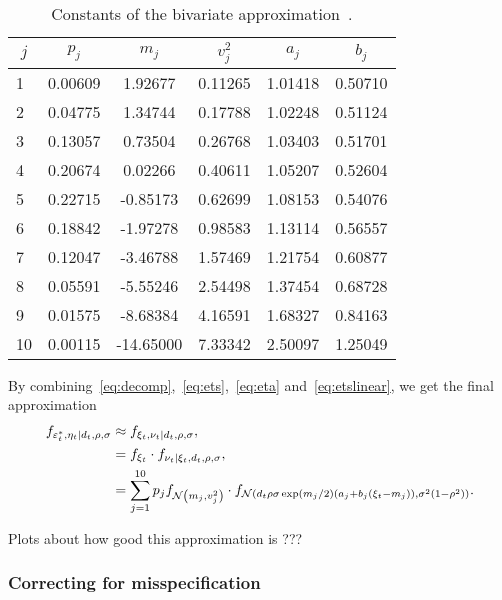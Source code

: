 \begin{table}[h!]
	\centering
	\caption{Constants of the bivariate approximation~\citep{Omori2007}.}
	\label{tab:constants}
	\begin{tabular}{cccccc}
		$j$                       & $p_j$    & $m_j$      & $v_j^2$ & $a_j$    & $b_j$    \\ \hline
		\multicolumn{1}{l|}{1}  & 0.00609 & 1.92677   & 0.11265                & 1.01418 & 0.50710 \\
		\multicolumn{1}{l|}{2}  & 0.04775 & 1.34744   & 0.17788                & 1.02248 & 0.51124 \\
		\multicolumn{1}{l|}{3}  & 0.13057 & 0.73504   & 0.26768                & 1.03403 & 0.51701 \\
		\multicolumn{1}{l|}{4}  & 0.20674 & 0.02266   & 0.40611                & 1.05207 & 0.52604 \\
		\multicolumn{1}{l|}{5}  & 0.22715 & -0.85173  & 0.62699                & 1.08153 & 0.54076 \\
		\multicolumn{1}{l|}{6}  & 0.18842 & -1.97278  & 0.98583                & 1.13114 & 0.56557 \\
		\multicolumn{1}{l|}{7}  & 0.12047 & -3.46788  & 1.57469                & 1.21754 & 0.60877 \\
		\multicolumn{1}{l|}{8}  & 0.05591 & -5.55246  & 2.54498                & 1.37454 & 0.68728 \\
		\multicolumn{1}{l|}{9}  & 0.01575 & -8.68384  & 4.16591                & 1.68327 & 0.84163 \\
		\multicolumn{1}{l|}{10} & 0.00115 & -14.65000 & 7.33342                & 2.50097 & 1.25049
	\end{tabular}
\end{table}

By combining~\eqref{eq:decomp},~\eqref{eq:ets},~\eqref{eq:eta} and~\eqref{eq:etslinear}, we get the final approximation
\begin{align*}
f_{\varepsilon_t^\ast,\eta_t\mid d_t,\rho,\sigma} &\approx f_{\xi_t,\nu_t\mid d_t,\rho,\sigma}, \\
&= f_{\xi_t}\cdot f_{\nu_t\mid\xi_t,d_t,\rho,\sigma}, \\
&= \sum_{j=1}^{10}p_jf_{\mathcal{N}\left(m_j,v_j^2\right)}\cdot f_{\mathcal{N}\left(d_t\rho\sigma\exp(m_j/2)(a_j+b_j(\xi_t-m_j)),\sigma^2\left(1-\rho^2\right)\right)}.
\end{align*}

Plots about how good this approximation is ???

\subsubsection{Correcting for misspecification}

